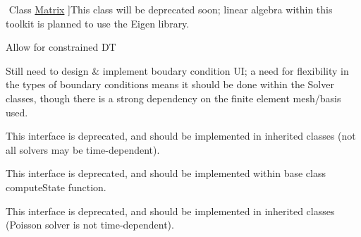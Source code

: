 \begin{DoxyRefList}
$$%
Class \mbox{\hyperlink{class_matrix}{Matrix}} ]This class will be deprecated soon; linear algebra within this toolkit is planned to use the Eigen library.  
\item[\label{todo__todo000007}%
\Hypertarget{todo__todo000007}%
Class \mbox{\hyperlink{class_mesh}{Mesh}} ]Allow for constrained DT  
\item[\label{todo__todo000010}%
\Hypertarget{todo__todo000010}%
Class \mbox{\hyperlink{class_solver_base}{Solver\+Base}} ]Still need to design \& implement boudary condition UI; a need for flexibility in the types of boundary conditions means it should be done within the Solver classes, though there is a strong dependency on the finite element mesh/basis used.  
\item[\label{todo__todo000011}%
\Hypertarget{todo__todo000011}%
Member \mbox{\hyperlink{class_solver_base_af2c51a926b461351926101b11cc6b60a}{Solver\+Base\+:\+:integrate\+In\+Time}} (void)=0]This interface is deprecated, and should be implemented in inherited classes (not all solvers may be time-\/dependent).  
\item[\label{todo__todo000012}%
\Hypertarget{todo__todo000012}%
Member \mbox{\hyperlink{class_solver_euler_a64caa7276a35f9e5408bec75bc2d3189}{Solver\+Euler\+:\+:integrate\+In\+Time}} (double current\+Time, double dt)]This interface is deprecated, and should be implemented within base class\textquotesingle{} compute\+State function.  
\item[\label{todo__todo000013}%
\Hypertarget{todo__todo000013}%
Member \mbox{\hyperlink{class_solver_poisson_a4ff8a1c96b933bc01fdd411d3ae45f20}{Solver\+Poisson\+:\+:integrate\+In\+Time}} (void)]This interface is deprecated, and should be implemented in inherited classes (Poisson solver is not time-\/dependent). 
\end{DoxyRefList}